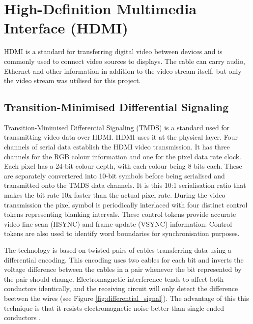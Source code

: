 \section{High-Definition Multimedia Interface (HDMI)}
HDMI is a standard for transferring digital video between devices and is commonly used to connect video sources to displays.
The cable can carry audio, Ethernet and other information in addition to the video stream itself, but only the video stream was utilised for this project.

\subsection{Transition-Minimised Differential Signaling}
Transition-Minimised Differential Signaling (TMDS) is a standard used for transmitting video data over HDMI.
HDMI uses it at the physical layer.
Four channels of serial data establish the HDMI video transmission.
It has three channels for the RGB colour information and one for the pixel data rate clock.
Each pixel has a 24-bit colour depth, with each colour being 8 bits each.
These are separately convertered into 10-bit symbols before being serialised and transmitted onto the TMDS data channels.
It is this 10:1 serialisation ratio that makes the bit rate 10x faster than the actual pixel rate.
During the video transmission the pixel symbol is periodically interlaced with four distinct control tokens representing blanking intervals.
These control tokens provide accurate video line scan (HSYNC) and frame update (VSYNC) information.
Control tokens are also used to identify word boundaries for synchronisation purposes.

The technology is based on twisted pairs of cables transferring data using a differential encoding.
This encoding uses two cables for each bit and inverts the voltage difference between the cables in a pair whenever the bit represented by the pair should change.
Electromagnetic interference tends to affect both conductors identically, and the receiving circuit will only detect the difference beetwen the wires (see Figure \ref{fig:differential_signal}). The advantage of this this technique is that it resists electromagnetic noise better than single-ended conductors \cite{diffsig}.


